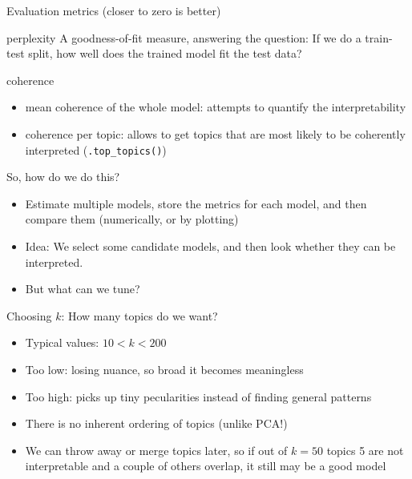 \documentclass[compress]{beamer}
\begin{document}
\begin{frame}{Evaluation metrics (closer to zero is better)}
\begin{block}{perplexity}
A goodness-of-fit measure, answering the question: If we do a train-test split, how well does the trained model fit the test data?
\end{block}

\pause 
\begin{block}{coherence}
\begin{itemize}
\item mean coherence of the whole model: attempts to quantify the interpretability
\item coherence per topic: allows to get topics that are most likely to be coherently interpreted (\texttt{.top\_topics()})
\end{itemize}
\end{block}

\end{frame}


\begin{frame}{So, how do we do this?}
\begin{itemize}[<+->]
	\item Estimate multiple models, store the metrics for each model, and then compare them (numerically, or by plotting)
	\item Idea: We select some candidate models, and then look whether they can be interpreted.
	\item But what can we tune?
\end{itemize}
\end{frame}


\begin{frame}{Choosing $k$: How many topics do we want?}
\begin{itemize}
	\item Typical values: $10<k<200$
	\item Too low: losing nuance, so broad it becomes meaningless
	\item Too high: picks up tiny pecularities instead of finding general patterns
	\item There is no inherent ordering of topics (unlike PCA!)
	\item We can throw away or merge topics later, so if out of $k=50$ topics 5 are not interpretable and a couple of others overlap, it still may be a good model
\end{itemize}
\end{frame}
\end{document}
